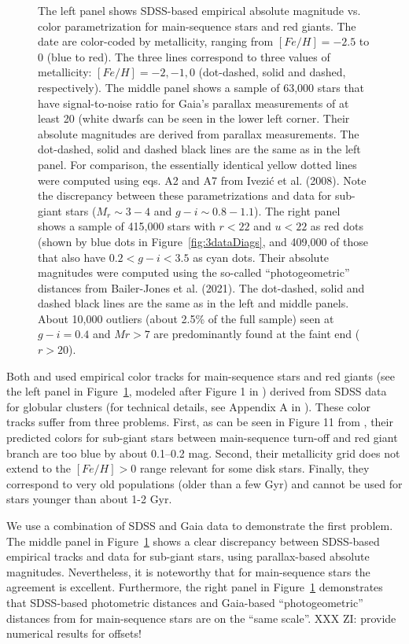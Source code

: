 \begin{figure}[b!]
\caption{The left panel shows SDSS-based empirical absolute magnitude vs. color parametrization for main-sequence stars and red giants.
The date are color-coded by metallicity, ranging from $[Fe/H] = -2.5$ to 0 (blue to red). The three lines correspond to three values of
metallicity: $[Fe/H] = -2, -1, 0$ (dot-dashed, solid and dashed, respectively). The middle panel shows a sample of 63,000 stars that have
signal-to-noise ratio for Gaia’s parallax measurements of at least 20 (white dwarfs can be seen in the lower left corner.
Their absolute magnitudes are derived from parallax measurements. The dot-dashed,
solid and dashed black lines are the same as in the left panel. For comparison, the essentially identical yellow dotted lines were computed
using eqs. A2 and A7 from Ivezi\'{c} et al. (2008).  Note the discrepancy between these parametrizations and data for sub-giant stars ($M_r \sim 3-4$
and $g-i \sim 0.8-1.1$). The right panel shows a sample of 415,000 stars with $r < 22$ and $u<22$ as red dots (shown by blue dots in
Figure~\ref{fig:3dataDiags}, and 409,000 of those that also have  $0.2 < g-i < 3.5$ as cyan dots. Their absolute magnitudes were computed
using the so-called “photogeometric” distances from Bailer-Jones et al. (2021). The dot-dashed, solid and dashed black lines are the
same as in the left and middle panels. About 10,000 outliers (about 2.5\% of the full
sample) seen at $g-i = 0.4$ and $Mr > 7$ are predominantly found at the faint end ($r>20$).}
\label{fig:3HRdiags}
\end{figure}


Both \cite{2012ApJ...757..166B} and \cite{2014ApJ...783..114G} used empirical color tracks for main-sequence stars
and red giants (see the left panel in Figure~\ref{fig:3HRdiags}, modeled after Figure 1 in \citealt{2014ApJ...783..114G})
derived from SDSS data for globular clusters (for technical details, see
Appendix A in \citealt{2008ApJ...684..287I}). These color tracks suffer from three problems. First, as can be seen in Figure 11 from
\cite{2014ApJ...783..114G}, their predicted colors for sub-giant stars between main-sequence turn-off and red giant branch are too blue by
about 0.1--0.2 mag. Second, their metallicity grid does not extend to the $[Fe/H]>0$ range relevant for some disk stars. Finally, they
correspond to very old populations (older than a few Gyr) and cannot be used for stars younger than about 1-2 Gyr. 

We use a combination of SDSS and Gaia data to demonstrate the first problem. The middle panel in Figure~\ref{fig:3HRdiags} 
shows a clear discrepancy between SDSS-based empirical tracks and data for sub-giant stars, using parallax-based absolute
magnitudes. Nevertheless, it is noteworthy that
for main-sequence stars the agreement is excellent. Furthermore, the right panel in Figure~\ref{fig:3HRdiags} demonstrates
that SDSS-based photometric distances and Gaia-based ``photogeometric'' distances from \cite{bailer-jones_estimating_2021}
for main-sequence stars are on the ``same scale''.  XXX ZI: provide numerical results for offsets! 
 
